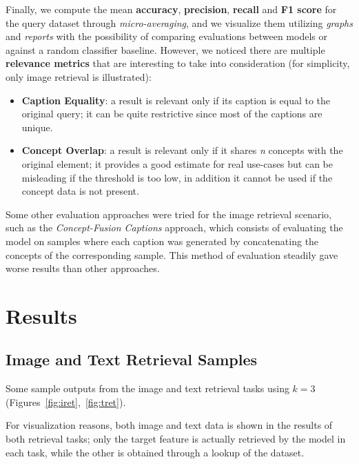 \documentclass[10pt,twocolumn,letterpaper]{article}
\begin{document}
Finally, we compute the mean \textbf{accuracy}, \textbf{precision}, \textbf{recall} and \textbf{F1 score} for the query dataset through \textit{micro-averaging}, and we visualize them utilizing \textit{graphs} and \textit{reports} with the possibility of comparing evaluations between models or against a random classifier baseline.
However, we noticed there are multiple \textbf{relevance metrics} that are interesting to take into consideration (for simplicity, only image retrieval is illustrated):
\begin{itemize}
   \item \textbf{Caption Equality}: a result is relevant only if its caption is equal to the original query; it can be quite restrictive since most of the captions are unique.
   \item \textbf{Concept Overlap}: a result is relevant only if it shares \textit{n} concepts with the original element; it provides a good estimate for real use-cases but can be misleading if the threshold is too low, in addition it cannot be used if the concept data is not present.
\end{itemize}

Some other evaluation approaches were tried for the image retrieval scenario, such as the \textit{Concept-Fusion Captions} approach, which consists of evaluating the model on samples where each caption was generated by concatenating the concepts of the corresponding sample.
This method of evaluation steadily gave worse results than other approaches.

\section{Results}

\subsection{Image and Text Retrieval Samples}
Some sample outputs from the image and text retrieval tasks using $k=3$ (Figures\ \ref{fig:iret},\ \ref{fig:tret}).

For visualization reasons, both image and text data is shown in the results of both retrieval tasks; only the target feature is actually retrieved by the model in each task, while the other is obtained through a lookup of the dataset.

%
\end{document}
